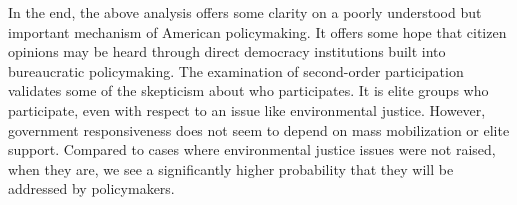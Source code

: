 \documentclass[
      12pt,
        ]{article}
\begin{document}
In the end, the above analysis offers some clarity on a poorly
understood but important mechanism of American policymaking. It offers
some hope that citizen opinions may be heard through direct democracy
institutions built into bureaucratic policymaking. The examination of
second-order participation validates some of the skepticism about who
participates. It is elite groups who participate, even with respect to
an issue like environmental justice. However, government responsiveness
does not seem to depend on mass mobilization or elite support. Compared
to cases where environmental justice issues were not raised, when they
are, we see a significantly higher probability that they will be
addressed by policymakers.
\newpage
\singlespacing 
           
   
\end{document}
